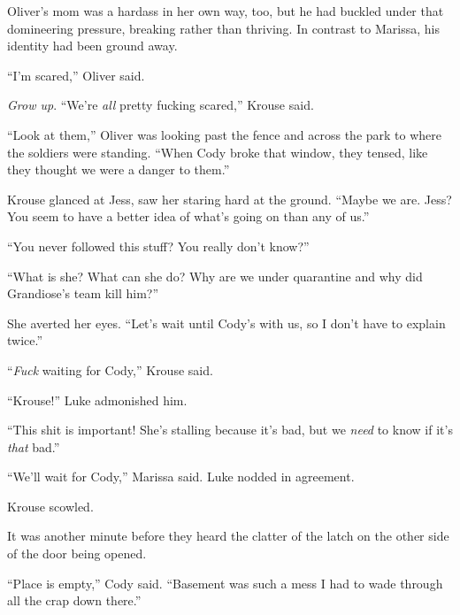 Oliver's mom was a hardass in her own way, too, but he had buckled under that domineering pressure, breaking rather than thriving.  In contrast to Marissa, his identity had been ground away.



``I'm scared,'' Oliver said.



\emph{Grow up}.  ``We're \emph{all} pretty fucking scared,'' Krouse said.



``Look at them,'' Oliver was looking past the fence and across the park to where the soldiers were standing.  ``When Cody broke that window, they tensed, like they thought we were a danger to them.''



Krouse glanced at Jess, saw her staring hard at the ground.  ``Maybe we are.  Jess?  You seem to have a better idea of what's going on than any of us.''



``You never followed this stuff?  You really don't know?''



``What is she?  What can she do?  Why are we under quarantine and why did Grandiose's team kill him?''



She averted her eyes.  ``Let's wait until Cody's with us, so I don't have to explain twice.''



``\emph{Fuck} waiting for Cody,'' Krouse said.



``Krouse!'' Luke admonished him.



``This shit is important!  She's stalling because it's bad, but we \emph{need} to know if it's \emph{that} bad.''



``We'll wait for Cody,'' Marissa said.  Luke nodded in agreement.



Krouse scowled.



It was another minute before they heard the clatter of the latch on the other side of the door being opened.



``Place is empty,'' Cody said.  ``Basement was such a mess I had to wade through all the crap down there.''



